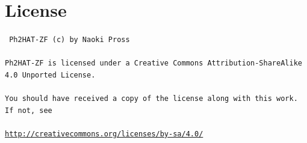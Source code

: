\documentclass[a4paper, twocolumn]{article}
\numberwithin{equation}{section}
\theoremstyle{hsr-def}
\theoremstyle{hsr-sub}
\begin{document}
\section*{License}
{ \tt
Ph2HAT-ZF (c) by Naoki Pross
\\\\
Ph2HAT-ZF is licensed under a Creative Commons Attribution-ShareAlike 4.0 Unported License.
\\\\
You should have received a copy of the license along with this work. If not, see 
\\\\
{\small\url{http://creativecommons.org/licenses/by-sa/4.0/}}
}
\end{document}
